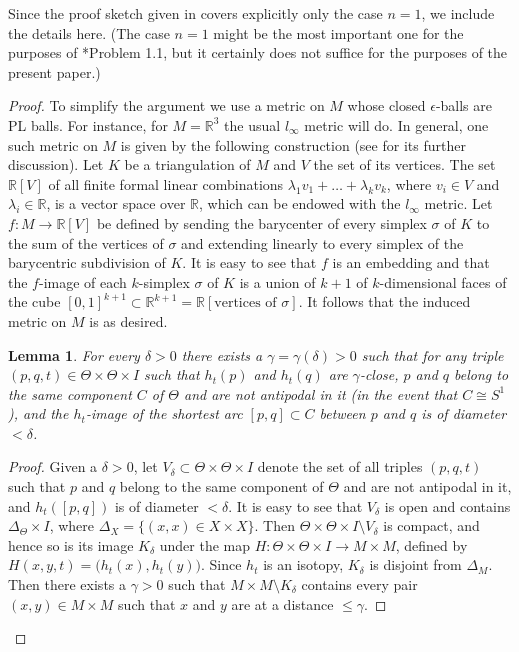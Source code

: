 \documentclass[a4paper,12pt,reqno,oneside]{amsart} %
\theoremstyle{plain}
\newtheorem{lemma}[theorem]{Lemma}
\theoremstyle{definition}
\theoremstyle{named}
\def\x{\times}
\def\but{\setminus}
\renewcommand{\:}{\colon}
\def\R{\mathbb{R}}
\begin{document}
Since the proof sketch given in \cite{MR1} covers explicitly only the case $n=1$, we include the details here.
(The case $n=1$ might be the most important one for the purposes of \cite{MR1}*{Problem 1.1}, but it certainly does not suffice 
for the purposes of the present paper.)

\begin{proof}
To simplify the argument we use a metric on $M$ whose closed $\epsilon$-balls are PL balls.
For instance, for $M=\R^3$ the usual $l_\infty$ metric will do.
In general, one such metric on $M$ is given by the following construction (see \cite{M-up} for its further discussion).
Let $K$ be a triangulation of $M$ and $V$ the set of its vertices.
The set $\R[V]$ of all finite formal linear combinations $\lambda_1v_1+\dots+\lambda_kv_k$, where $v_i\in V$ and $\lambda_i\in\R$, 
is a vector space over $\R$, which can be endowed with the $l_\infty$ metric.
Let $f\:M\to\R[V]$ be defined by sending the barycenter of every simplex $\sigma$ of $K$ to the sum of the vertices of $\sigma$
and extending linearly to every simplex of the barycentric subdivision of $K$.
It is easy to see that $f$ is an embedding and that the $f$-image of each $k$-simplex $\sigma$ of $K$ is a union of $k+1$ of $k$-dimensional
faces of the cube $[0,1]^{k+1}\subset\R^{k+1}=\R[\text{vertices of $\sigma$}]$.
It follows that the induced metric on $M$ is as desired.

\begin{lemma}\label{strong lemma}
For every $\delta>0$ there exists a $\gamma=\gamma(\delta)>0$ such that for any triple $(p,q,t)\in\Theta\x\Theta\x I$ 
such that $h_t(p)$ and $h_t(q)$ are $\gamma$-close, $p$ and $q$ belong to the same component $C$ of $\Theta$ and are not antipodal in it 
(in the event that $C\cong S^1$), and the $h_t$-image of the shortest arc $[p,q]\subset C$ between $p$ and $q$ is of diameter $<\delta$.
\end{lemma}

\begin{proof}
Given a $\delta>0$, let $V_\delta\subset\Theta\x\Theta\x I$ denote the set of all triples $(p,q,t)$ such that $p$ and $q$ 
belong to the same component of $\Theta$ and are not antipodal in it, and $h_t([p,q])$ is of diameter $<\delta$.
It is easy to see that $V_\delta$ is open and contains $\Delta_\Theta\x I$, where $\Delta_X=\{(x,x)\in X\x X\}$.
Then $\Theta\x\Theta\x I\but V_\delta$ is compact, and hence so is its image $K_\delta$ under the map $H\:\Theta\x\Theta\x I\to M\x M$, 
defined by $H(x,y,t)=\big(h_t(x),h_t(y)\big)$.
Since $h_t$ is an isotopy, $K_\delta$ is disjoint from $\Delta_M$.
Then there exists a $\gamma>0$ such that $M\x M\but K_\delta$ contains every pair $(x,y)\in M\x M$ such that 
$x$ and $y$ are at a distance $\le\gamma$.
\end{proof}


\end{proof}
\end{document}
